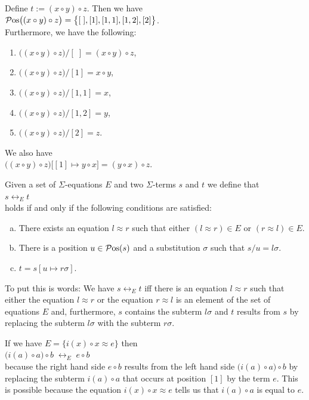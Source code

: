\example
Define $t := (x \circ y) \circ z$.  Then we have
\\[0.2cm]
\hspace*{1.3cm}
$\mathcal{P}\mathrm{os}\bigl((x \circ y) \circ z\bigr) = \bigl\{ [\;], [1], [1,1], [1,2], [2]\bigr\}$.
\\[0.2cm]
Furthermore, we have the following:
\begin{enumerate}

\item $\bigl((x \circ y) \circ z\bigr)/[\;] = (x \circ y) \circ z$,
\item $\bigl((x \circ y) \circ z\bigr)/[1] = x \circ y$, 
\item $\bigl((x \circ y) \circ z\bigr)/[1,1] = x$,
\item $\bigl((x \circ y) \circ z\bigr)/[1,2] = y$,
\item $\bigl((x \circ y) \circ z\bigr)/[2]   = z$.
\end{enumerate}
We also have
\\[0.2cm]
\hspace*{1.3cm}
$\bigl((x \circ y) \circ z\bigr)\bigl[[1] \mapsto y \circ x\bigr] = (y \circ x) \circ z$. \eox

\begin{Definition}[$\leftrightarrow_E$]
  Given a set of $\Sigma$-equations $E$ and two $\Sigma$-terms $s$ and $t$ we define that
  \\[0.2cm]
  \hspace*{1.3cm}
  $s \leftrightarrow_E t$
  \\[0.2cm]
  holds if and only if the following conditions are satisfied:
  \begin{enumerate}[(a)]
  \item There exists an equation $l \approx r$  such that either $(l \approx r) \in E$ or $(r \approx l) \in  E$.
  \item There is a position $u \in \mathcal{P}\mathrm{os}(s)$ and a substitution $\sigma$ such that $s/u = l\sigma$.
  \item $t = s[u \mapsto r\sigma]$. \eox
  \end{enumerate}
\end{Definition}
To put this is words: We have $s \leftrightarrow_E t$ iff there is an equation $l \approx r$ such that
either the equation $l \approx r$ or the equation $r \approx l$ is an element of the set of equations $E$ and,
furthermore, $s$ contains the subterm $l\sigma$ and $t$ results from $s$ by replacing the subterm $l\sigma$
with the subterm $r\sigma$. 

\example
If we have $E = \bigl\{ i(x) \circ x \approx e \bigr\}$ then
\\[0.2cm]
\hspace*{1.3cm}
$\bigl(i(a) \circ a\bigr) \circ b \;\leftrightarrow_E\; e \circ b$
\\[0.2cm]
because the right hand side $e \circ b$ results from the left hand side $\bigl(i(a) \circ a\bigr) \circ b$ by
replacing the subterm $i(a) \circ a$ that occurs at position $[1]$ by the term $e$.
This is possible because the equation $i(x) \circ x \approx e$ tells us that $i(a) \circ a$ is equal to $e$.
\eod


